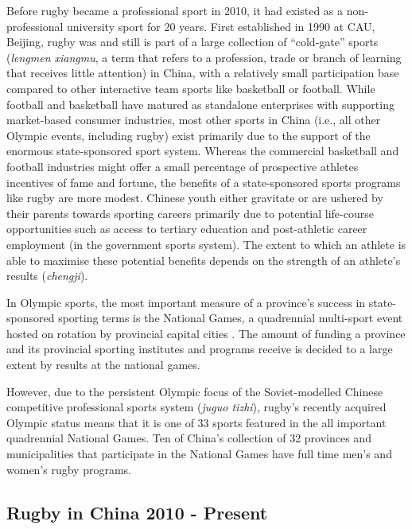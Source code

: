 {Before rugby became a professional sport in 2010, it had existed as a non-professional university sport for 20 years.  First established in 1990 at CAU, Beijing, rugby was and still is part of a large collection of ``cold-gate'' sports (\textit{lengmen xiangmu}, a term that refers to a profession, trade or branch of learning that receives little attention) in China, with a relatively small participation base compared to other interactive team sports like basketball or football.  While football and basketball have matured as standalone enterprises with supporting market-based consumer industries, most other sports in China (i.e., all other Olympic events, including rugby) exist primarily due to the support of the enormous state-sponsored sport system.  Whereas the commercial basketball and football industries might offer a small percentage of prospective athletes incentives of fame and fortune, the benefits of a state-sponsored sports programs like rugby are more modest.  Chinese youth either gravitate or are ushered by their parents towards sporting careers primarily due to potential life-course opportunities such as access to tertiary education and post-athletic career employment (in the government sports system).  The extent to which an athlete is able to maximise these potential benefits depends on the strength of an athlete's results (\textit{chengji}).

In Olympic sports, the most important measure of a province's success in state-sponsored sporting terms is the National Games, a quadrennial multi-sport event hosted on rotation by provincial capital cities \citep{Hong2002}.  The amount of funding a province and its provincial sporting institutes and programs receive is decided to a large extent by results at the national games.

However, due to the persistent Olympic focus of the Soviet-modelled Chinese competitive professional sports system (\textit{juguo tizhi}), rugby's recently acquired Olympic status means that it is one of 33 sports featured in the all important quadrennial National Games.  Ten of China's collection of 32 provinces and municipalities that participate in the National Games have full time men's and women's rugby programs.


\subsection{Rugby in China 2010 - Present}

}
